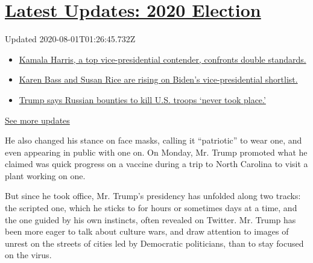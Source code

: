 \hypertarget{latest-updates-2020-election}{%
\section{\texorpdfstring{\href{https://www.nytimes.com/2020/07/31/us/elections/biden-vs-trump.html?action=click\&pgtype=Article\&state=default\&region=MAIN_CONTENT_1\&context=storylines_live_updates}{Latest
Updates: 2020
Election}}{Latest Updates: 2020 Election}}\label{latest-updates-2020-election}}

Updated 2020-08-01T01:26:45.732Z

\begin{itemize}
\tightlist
\item
  \href{https://www.nytimes.com/2020/07/31/us/elections/biden-vs-trump.html?action=click\&pgtype=Article\&state=default\&region=MAIN_CONTENT_1\&context=storylines_live_updates\#link-29fdff45}{Kamala
  Harris, a top vice-presidential contender, confronts double
  standards.}
\item
  \href{https://www.nytimes.com/2020/07/31/us/elections/biden-vs-trump.html?action=click\&pgtype=Article\&state=default\&region=MAIN_CONTENT_1\&context=storylines_live_updates\#link-13ec3d9c}{Karen
  Bass and Susan Rice are rising on Biden's vice-presidential
  shortlist.}
\item
  \href{https://www.nytimes.com/2020/07/31/us/elections/biden-vs-trump.html?action=click\&pgtype=Article\&state=default\&region=MAIN_CONTENT_1\&context=storylines_live_updates\#link-49e9a016}{Trump
  says Russian bounties to kill U.S. troops `never took place.'}
\end{itemize}

\href{https://www.nytimes.com/2020/07/31/us/elections/biden-vs-trump.html?action=click\&pgtype=Article\&state=default\&region=MAIN_CONTENT_1\&context=storylines_live_updates}{See
more updates}

He also changed his stance on face masks, calling it ``patriotic'' to
wear one, and even appearing in public with one on. On Monday, Mr. Trump
promoted what he claimed was quick progress on a vaccine during a trip
to North Carolina to visit a plant working on one.

But since he took office, Mr. Trump's presidency has unfolded along two
tracks: the scripted one, which he sticks to for hours or sometimes days
at a time, and the one guided by his own instincts, often revealed on
Twitter. Mr. Trump has been more eager to talk about culture wars, and
draw attention to images of unrest on the streets of cities led by
Democratic politicians, than to stay focused on the virus.

